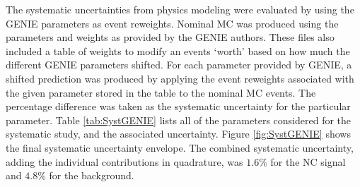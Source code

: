 The systematic uncertainties from physics modeling were evaluated by using the GENIE parameters as event reweights. Nominal MC was produced using the parameters and weights as provided by the GENIE authors. These files also included a table of weights to modify an events `worth' based on how much the different GENIE parameters shifted. For each parameter provided by GENIE, a shifted prediction was produced by applying the event reweights associated with the given parameter stored in the table to the nominal MC events. The percentage difference was taken as the systematic uncertainty for the particular parameter. Table \ref{tab:SystGENIE} lists all of the parameters considered for the systematic study, and the associated uncertainty. Figure \ref{fig:SystGENIE} shows the final systematic uncertainty envelope. The combined systematic uncertainty, adding the individual contributions in quadrature, was $1.6\%$ for the NC signal and $4.8\%$ for the background.

